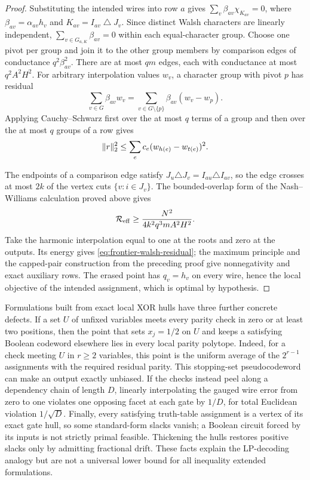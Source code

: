 \begin{proof}
Substituting the intended wires into row \(a\) gives
\(\sum_v\beta_{av}\chi_{K_{av}}=0\), where
\(\beta_{av}=\alpha_{av}h_v\) and
\(K_{av}=I_{av}\mathbin\triangle J_v\).  Since distinct Walsh characters
are linearly independent, \(\sum_{v\in G_{a,K}}\beta_{av}=0\) within each
equal-character group.  Choose one pivot per group and join it to the other
group members by comparison edges of conductance
\(q^2\beta_{av}^2\).  There are at most
\(qm\) edges, each with conductance at most \(q^2A^2H^2\).  For arbitrary
interpolation values \(w_v\), a character group with pivot \(p\) has
residual
\[
 \sum_{v\in G}\beta_{av}w_v
 =\sum_{v\in G\setminus\{p\}}\beta_{av}(w_v-w_p).
\]
Applying Cauchy--Schwarz first over the at most \(q\) terms of a group and
then over the at most \(q\) groups of a row gives
\[
 \lVert r\rVert_2^2\leq
 \sum_ec_e(w_{h(e)}-w_{t(e)})^2.
\]

The endpoints of a comparison edge satisfy
\(J_u\triangle J_v=I_{au}\triangle I_{av}\), so the edge crosses at most
\(2k\) of the vertex cuts \(\{v:i\in J_v\}\).  The bounded-overlap form of
the Nash--Williams calculation proved above gives
\[
 \mathcal R_{\rm eff}
 \geq\frac{N^2}{4k^2q^3mA^2H^2}.
\]
Take the harmonic interpolation equal to one at the roots and zero at the
outputs.  Its energy gives \eqref{eq:frontier-walsh-residual}; the maximum
principle and the capped-pair construction from the preceding proof give
nonnegativity and exact auxiliary rows.  The erased point has
\(q_v=h_v\) on every wire, hence the local objective of the intended
assignment, which is optimal by hypothesis.
\end{proof}

Formulations built from exact local XOR hulls have three further concrete
defects.  If a set \(U\) of unfixed variables meets every parity check in zero or at
least two positions, then the point that sets \(x_j=1/2\) on \(U\) and keeps
a satisfying Boolean codeword elsewhere lies in every local parity polytope.
Indeed, for a check meeting \(U\) in \(r\geq2\) variables, this point is the
uniform average of the \(2^{r-1}\) assignments with the required residual
parity.  This stopping-set pseudocodeword can make an output exactly
unbiased.  If the checks instead peel along a dependency chain of length
\(D\), linearly interpolating the gauged wire error from zero to one
violates one opposing facet at each gate by \(1/D\), for total Euclidean
violation \(1/\sqrt D\).  Finally, every satisfying truth-table assignment
is a vertex of its exact gate hull, so some standard-form slacks vanish; a
Boolean circuit forced by its inputs is not strictly primal feasible.
Thickening the hulls restores positive slacks only by admitting fractional
drift.  These facts explain the LP-decoding analogy but are not a universal
lower bound for all inequality extended formulations.

